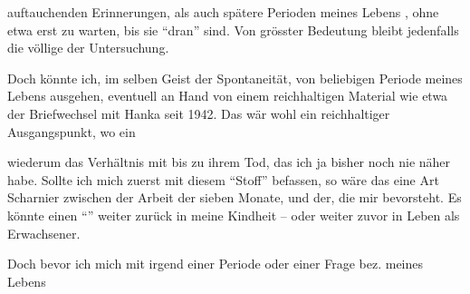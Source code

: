  auftauchenden Erinnerungen, als auch spätere Perioden meines Lebens , ohne etwa erst zu warten, bis sie ``dran'' sind. Von grösster Bedeutung bleibt jedenfalls die völlige  der Untersuchung.

Doch könnte ich, im selben Geist der Spontaneität, von  beliebigen Periode meines Lebens ausgehen, eventuell an Hand von einem reichhaltigen Material wie etwa der Briefwechsel mit Hanka seit 1942. Das wär wohl ein reichhaltiger Ausgangspunkt, wo ein 

wiederum das Verhältnis mit  bis zu ihrem Tod, das ich ja bisher noch nie näher  habe. Sollte ich mich zuerst mit diesem ``Stoff'' befassen, so wäre das eine Art Scharnier zwischen der Arbeit der  sieben Monate, und der, die mir bevorsteht. Es könnte  einen ``''   weiter zurück in meine Kindheit -- oder weiter zuvor in  Leben als Erwachsener.

Doch bevor ich mich  mit irgend einer Periode oder einer Frage bez. meines Lebens 
